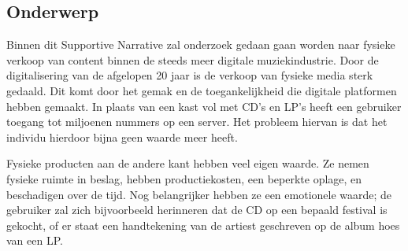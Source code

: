 \noindent{}

\subsection{Onderwerp}
Binnen dit Supportive Narrative zal onderzoek gedaan gaan worden naar fysieke verkoop van content binnen de steeds meer digitale muziekindustrie. Door de digitalisering van de afgelopen 20 jaar is de verkoop van fysieke media sterk gedaald.  Dit komt door het gemak en de toegankelijkheid die digitale platformen hebben gemaakt. In plaats van een kast vol met CD's en LP's heeft een gebruiker toegang tot miljoenen nummers op een server. Het probleem hiervan is dat het individu hierdoor bijna geen waarde meer heeft.

Fysieke producten aan de andere kant hebben veel eigen waarde. Ze nemen fysieke ruimte in beslag, hebben productiekosten, een beperkte oplage, en beschadigen over de tijd. Nog belangrijker hebben ze een emotionele waarde; de gebruiker zal zich bijvoorbeeld herinneren dat de CD op een bepaald festival is gekocht, of er staat een handtekening van de artiest geschreven op de album hoes van een LP.

